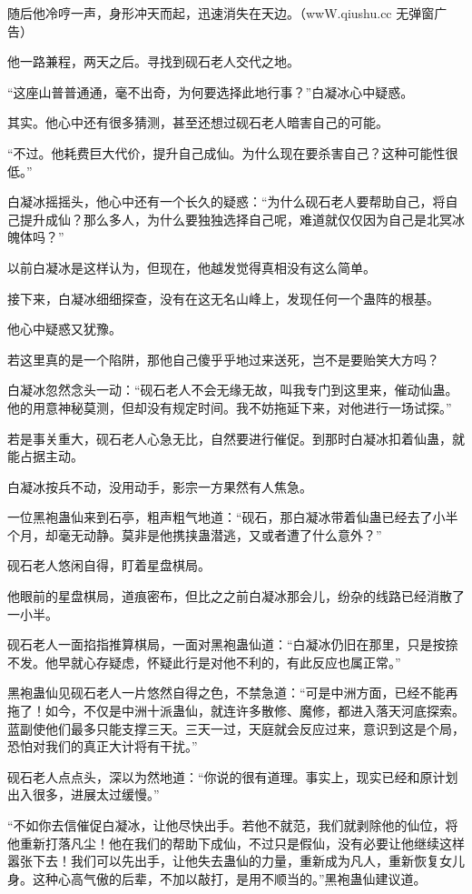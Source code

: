 \begin{this_body}
随后他冷哼一声，身形冲天而起，迅速消失在天边。（wwW.qiushu.cc 无弹窗广告）

他一路兼程，两天之后。寻找到砚石老人交代之地。

“这座山普普通通，毫不出奇，为何要选择此地行事？”白凝冰心中疑惑。

其实。他心中还有很多猜测，甚至还想过砚石老人暗害自己的可能。

“不过。他耗费巨大代价，提升自己成仙。为什么现在要杀害自己？这种可能性很低。”

白凝冰摇摇头，他心中还有一个长久的疑惑：“为什么砚石老人要帮助自己，将自己提升成仙？那么多人，为什么要独独选择自己呢，难道就仅仅因为自己是北冥冰魄体吗？”

以前白凝冰是这样认为，但现在，他越发觉得真相没有这么简单。

接下来，白凝冰细细探查，没有在这无名山峰上，发现任何一个蛊阵的根基。

他心中疑惑又犹豫。

若这里真的是一个陷阱，那他自己傻乎乎地过来送死，岂不是要贻笑大方吗？

白凝冰忽然念头一动：“砚石老人不会无缘无故，叫我专门到这里来，催动仙蛊。他的用意神秘莫测，但却没有规定时间。我不妨拖延下来，对他进行一场试探。”

若是事关重大，砚石老人心急无比，自然要进行催促。到那时白凝冰扣着仙蛊，就能占据主动。

白凝冰按兵不动，没用动手，影宗一方果然有人焦急。

一位黑袍蛊仙来到石亭，粗声粗气地道：“砚石，那白凝冰带着仙蛊已经去了小半个月，却毫无动静。莫非是他携挟蛊潜逃，又或者遭了什么意外？”

砚石老人悠闲自得，盯着星盘棋局。

他眼前的星盘棋局，道痕密布，但比之之前白凝冰那会儿，纷杂的线路已经消散了一小半。

砚石老人一面掐指推算棋局，一面对黑袍蛊仙道：“白凝冰仍旧在那里，只是按捺不发。他早就心存疑虑，怀疑此行是对他不利的，有此反应也属正常。”

黑袍蛊仙见砚石老人一片悠然自得之色，不禁急道：“可是中洲方面，已经不能再拖了！如今，不仅是中洲十派蛊仙，就连许多散修、魔修，都进入落天河底探索。蓝副使他们最多只能支撑三天。三天一过，天庭就会反应过来，意识到这是个局，恐怕对我们的真正大计将有干扰。”

砚石老人点点头，深以为然地道：“你说的很有道理。事实上，现实已经和原计划出入很多，进展太过缓慢。”

“不如你去信催促白凝冰，让他尽快出手。若他不就范，我们就剥除他的仙位，将他重新打落凡尘！他在我们的帮助下成仙，不过只是假仙，没有必要让他继续这样嚣张下去！我们可以先出手，让他失去蛊仙的力量，重新成为凡人，重新恢复女儿身。这种心高气傲的后辈，不加以敲打，是用不顺当的。”黑袍蛊仙建议道。


\end{this_body}
